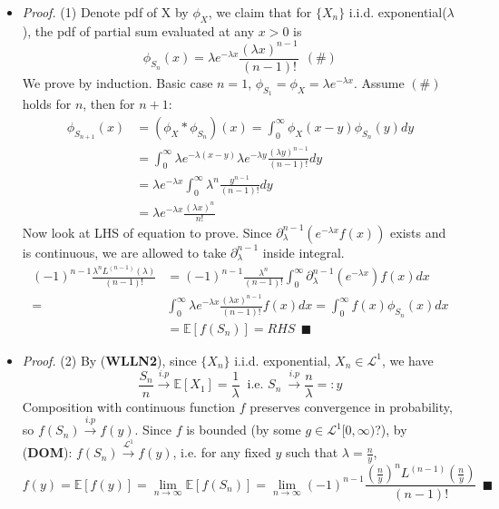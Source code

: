 \documentclass[a4paper,12pt,twoside]{book}
\begin{document}
\begin{itemize}
	\item[]\textit{Proof.} (1) Denote pdf of X by $\phi_X$, we claim that for $\{X_n\}$ i.i.d. exponential($\lambda$), the pdf of partial sum evaluated at any $x>0$ is
	\begin{equation}
		\phi_{S_n}(x)=\lambda e^{-\lambda x}\frac{(\lambda x)^{n-1}}{(n-1)!}~~(\#)
	\end{equation}
	We prove by induction. Basic case $n=1$, $\phi_{S_1}=\phi_X=\lambda e^{-\lambda x}$. Assume $(\#)$ holds for $n$, then for $n+1$:
	\begin{equation}
		\begin{split}
			\phi_{S_{n+1}}(x)&=(\phi_X * \phi_{S_{n}})(x)=\int_0^{\infty}\phi_X(x-y)\phi_{S_{n}}(y)dy\\
			&=\int_0^{\infty}\lambda e^{-\lambda (x-y)}\lambda e^{-\lambda y}\frac{(\lambda y)^{n-1}}{(n-1)!}dy\\
			&=\lambda e^{-\lambda x} \int_{0}^{\infty} \lambda^n \frac{y^{n-1}}{(n-1)!} dy\\
			&=\lambda e^{-\lambda x}\frac{(\lambda x)^{n}}{n!}
		\end{split}
	\end{equation}
	Now look at LHS of equation to prove. Since $\partial_{\lambda}^{n-1}(e^{-\lambda x}f(x))$ exists and is continuous, we are allowed to take $\partial_{\lambda}^{n-1}$ inside integral.
	\begin{equation}
		\begin{split}
			(-1)^{n-1}\frac{\lambda^n L^{(n-1)}(\lambda)}{(n-1)!}&=(-1)^{n-1}\frac{\lambda^n}{(n-1)!}\int_{0}^{\infty}\partial_{\lambda}^{n-1}(e^{-\lambda x})f(x)dx\\
			=&\int_{0}^{\infty}\lambda e^{-\lambda x}\frac{(\lambda x)^{n-1}}{(n-1)!}f(x)dx=\int_{0}^{\infty}f(x)\phi_{S_n}(x)dx\\
			&=\mathbb{E}\left[f(S_n)\right]=RHS~~\blacksquare
		\end{split}
	\end{equation}

	\item[]\textit{Proof.} (2) By (\textbf{WLLN2}), since $\{X_n\}$ i.i.d. exponential, $X_n \in \mathcal{L}^1$, we have
	\begin{equation}
		\frac{S_n}{n} \xrightarrow{i.p} \mathbb{E}\left[X_1\right]=\frac{1}{\lambda}~\text{ i.e. }S_n~\xrightarrow{i.p} \frac{n}{\lambda}=:y
	\end{equation}
	Composition with continuous function $f$ preserves convergence in probability, so $f(S_n) \xrightarrow{i.p} f(y)$.\newline
	Since $f$ is bounded (by some $g\in \mathcal{L}^1[0,\infty)$?), by (\textbf{DOM}): $f(S_n) \xrightarrow{\mathcal{L}^1} f(y)$, i.e. for any fixed $y$ such that $\lambda = \frac{n}{y}$,
	\begin{equation}
		f(y)=\mathbb{E}\left[f(y)\right]=\lim\limits_{n\rightarrow\infty}\mathbb{E}\left[f(S_n)\right]=\lim\limits_{n\rightarrow\infty}(-1)^{n-1}\frac{(\frac{n}{y})^n L^{(n-1)}(\frac{n}{y})}{(n-1)!}~~\blacksquare
	\end{equation}
\end{itemize}
\end{document}
